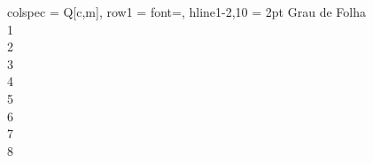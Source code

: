 
\begin{table}
    \centering
    \caption{Códigos dos Graus de Folha do Algodão Upland}
    \begin{tblr}{
        colspec = {Q[c,m]},
        row{1} = {font=\bfseries},
        hline{1-2,10} = {2pt}
        }
        Grau de Folha \\
        1                      \\
        2                      \\
        3                      \\
        4                      \\
        5                      \\
        6                      \\
        7                      \\                
        8                      \\    
    \end{tblr}
\label{tab_grau_folha}
\end{table}
